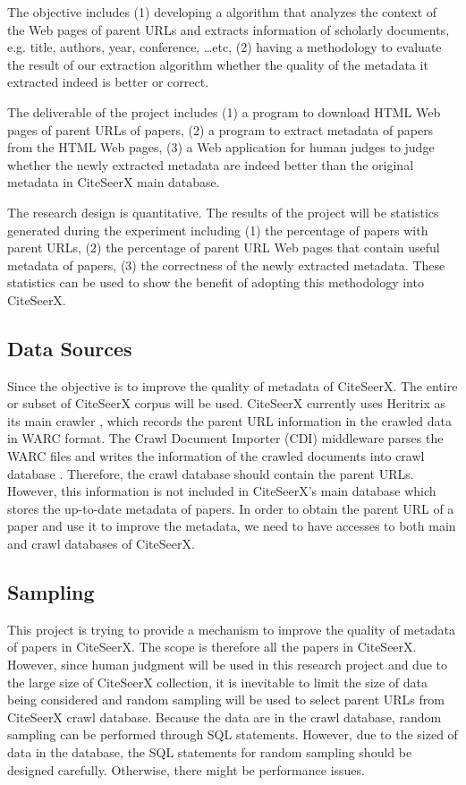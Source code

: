 \documentclass[prodmode]{acmsmall} %
\begin{document}
The objective includes (1) developing a algorithm that analyzes the context of the Web pages of parent URLs and extracts information of scholarly documents, e.g. title, authors, year, conference, …etc, (2) having a methodology to evaluate the result of our extraction algorithm whether the quality of the metadata it extracted indeed is better or correct.

The deliverable of the project includes (1) a program to download HTML Web pages of parent URLs of papers, (2) a program to extract metadata of papers from the HTML Web pages, (3) a Web application for human judges to judge whether the newly extracted metadata are indeed better than the original metadata in CiteSeerX main database.

The research design is quantitative. The results of the project will be statistics generated during the experiment including (1) the percentage of papers with parent URLs, (2) the percentage of parent URL Web pages that contain useful metadata of papers, (3) the correctness of the newly extracted metadata. These statistics can be used to show the benefit of adopting this methodology into CiteSeerX.

\subsection{Data Sources}

Since the objective is to improve the quality of metadata of CiteSeerX. The entire or subset of CiteSeerX corpus will be used. CiteSeerX currently uses Heritrix as its main crawler \cite{wu2012web}, which records the parent URL information in the crawled data in WARC format. The Crawl Document Importer (CDI) middleware parses the WARC files and writes the information of the crawled documents into crawl database \cite{wu2012web}. Therefore, the crawl database should contain the parent URLs. However, this information is not included in CiteSeerX’s main database which stores the up-to-date metadata of papers. In order to obtain the parent URL of a paper and use it to improve the metadata, we need to have accesses to both main and crawl databases of CiteSeerX.

\subsection{Sampling}

This project is trying to provide a mechanism to improve the quality of metadata of papers in CiteSeerX. The scope is therefore all the papers in CiteSeerX. However, since human judgment will be used in this research project and due to the large size of CiteSeerX collection, it is inevitable to limit the size of data being considered and random sampling will be used to select parent URLs from CiteSeerX crawl database. Because the data are in the crawl database, random sampling can be performed through SQL statements. However, due to the sized of data in the database, the SQL statements for random sampling should be designed carefully. Otherwise, there might be performance issues.
\end{document}
